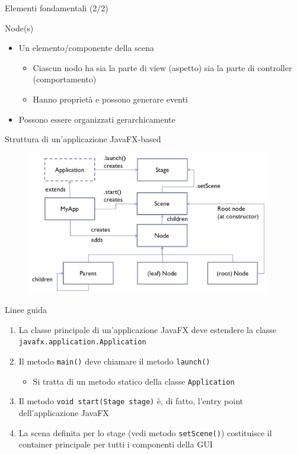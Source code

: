 \documentclass[presentation]{beamer}
\begin{document}
\begin{frame} {Elementi fondamentali (2/2)}
\begin{block}{Node(s)}
\begin{itemize}
\item Un elemento/componente della scena
\begin{itemize}
\item Ciascun nodo ha sia la parte di view (aspetto) sia la parte di controller (comportamento)
\item Hanno proprietà e possono generare eventi
\end{itemize}
\item Possono essere organizzati gerarchicamente
\end{itemize}
\end{block}
\end{frame}

%

\begin{frame}{Struttura di un'applicazione JavaFX-based}
\begin{figure}
\includegraphics[width=0.95\textwidth]{img/javafx-app-arch.png}
\end{figure}
\end{frame}

\begin{frame}{Linee guida}
\begin{enumerate}\itemsep20pt
\item La classe principale di un'applicazione JavaFX deve estendere la classe \texttt{javafx.application.Application}
\item Il metodo \texttt{main()} deve chiamare il metodo \texttt{launch()}
\begin{itemize}
\item Si tratta di un metodo statico della classe \texttt{Application}
\end{itemize}
\item Il metodo \texttt{void start(Stage stage)} è, di fatto, l'entry point dell'applicazione JavaFX
\item La scena definita per lo stage (vedi metodo \texttt{setScene()}) costituisce il container principale per tutti i componenti della GUI
\end{enumerate}
\end{frame}
\end{document}
